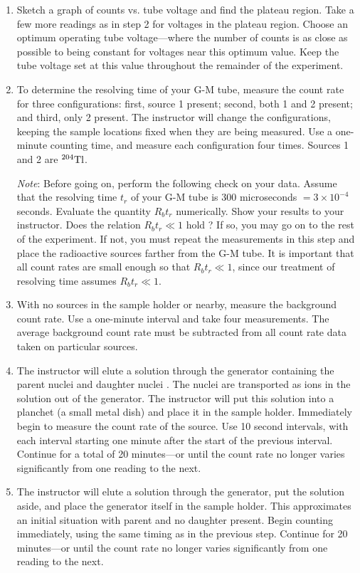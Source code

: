 \begin{enumerate}
\item Sketch a graph of counts vs. tube voltage and find the
plateau region.  Take a few more readings as in step 2 for voltages in
the plateau region.  Choose an optimum operating tube voltage---where
the number of counts is as close as possible to being constant for
voltages near this optimum value. Keep the tube voltage set at this
value throughout the remainder of the experiment.

\item To determine the resolving time of your G-M tube, measure the count
rate for three configurations: first, source 1 present; second, both 1
and 2 present; and third, only 2 present.  The instructor will change
the configurations, keeping the sample locations fixed when they are
being measured.  Use a one-minute counting time, and measure each
configuration four times.  Sources 1 and 2 are ${}^{204}{\rm Tl}$.

{\em Note}: Before going on, perform the following check on your data.
Assume that the resolving time $t_{r}$ of your G-M tube is
300 microseconds $ = 3 \times 10^{-4}$ seconds.  Evaluate the
quantity $R_{b} t_{r}$ numerically. Show your results
to your instructor. Does the relation
$ R_{b} t_{r} \ll 1$ hold ?
If so, you may go on to the rest of the experiment.  If not, you
must repeat the measurements in this step and place the radioactive
sources farther from the G-M tube.  It is important that all count
rates are small enough so that $R_{b}t_{r} \ll 1$, since our treatment of resolving time
assumes $R_{b}t_{r} \ll 1$.

\item With no sources in the sample holder or nearby, measure the
background count rate.  Use a one-minute interval and take four
measurements.  The average background count rate must be subtracted
from all count rate data taken on particular sources.

\item The instructor will elute a solution through the generator
containing the parent nuclei \cs and daughter nuclei \bam.  The
\bam nuclei are transported as ions in the solution out of the
generator.  The instructor will put this solution into a planchet (a
small metal dish) and place it in the sample holder.  Immediately
begin to measure the count rate of the \bam source.  Use 10 second
intervals, with each interval starting one
minute after the start of the previous interval.  Continue for a total
of 20 minutes---or until the count rate no longer varies significantly
from one reading to the next. 

\item The instructor will elute a solution through the \cs generator,
put the solution aside, and place the generator itself in the sample
holder. This approximates an initial situation with parent and no
daughter present. Begin counting immediately, using the same timing as
in the previous step.  Continue for 20 minutes---or until the count
rate no longer varies significantly from one reading to the next.
\end{enumerate}

